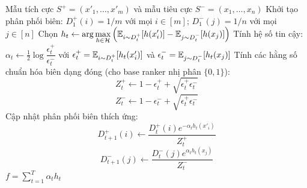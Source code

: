 \begin{algorithm}[H]
\caption{BipartiteRankBoost}
\label{alg:bipartite_rankboost}
\begin{algorithmic}[1]
\REQUIRE Mẫu tích cực $S^+ = (x'_1, \ldots, x'_m)$ và mẫu tiêu cực $S^- = (x_1, \ldots, x_n)$
\STATE Khởi tạo phân phối biên: $D^+_1(i) = 1/m$ với mọi $i \in [m]$; $D^-_1(j) = 1/n$ với mọi $j \in [n]$
    \STATE Chọn $h_t \leftarrow \displaystyle\arg\max_{h \in \mathcal{H}} \left( \mathbb{E}_{i \sim D^+_t}[h(x'_i)] - \mathbb{E}_{j \sim D^-_t}[h(x_j)] \right)$
    \STATE Tính hệ số tin cậy: $\alpha_t \leftarrow \frac{1}{2}\log\dfrac{\epsilon^+_t}{\epsilon^-_t}$ \quad với $\epsilon^+_t = \mathbb{E}_{i \sim D^+_t}[h_t(x'_i)]$ và $\epsilon^-_t = \mathbb{E}_{j \sim D^-_t}[h_t(x_j)]$
    \STATE Tính các hằng số chuẩn hóa biên dạng đóng (cho base ranker nhị phân $\{0,1\}$):
           $$Z^+_t \leftarrow 1 - \epsilon^+_t + \sqrt{\epsilon^+_t \epsilon^-_t}$$
           $$Z^-_t \leftarrow 1 - \epsilon^-_t + \sqrt{\epsilon^+_t \epsilon^-_t}$$
    \STATE Cập nhật phân phối biên thích ứng:
           $$D^+_{t+1}(i) \leftarrow \frac{D^+_t(i) e^{-\alpha_t h_t(x'_i)}}{Z^+_t}$$
           $$D^-_{t+1}(j) \leftarrow \frac{D^-_t(j) e^{\alpha_t h_t(x_j)}}{Z^-_t}$$
\ENDFOR
\RETURN $f = \sum_{t=1}^T \alpha_t h_t$
\end{algorithmic}
\end{algorithm}


